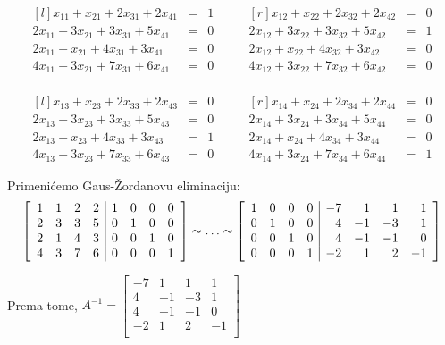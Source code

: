 \documentclass[10pt, a4paper]{article}
\begin{document}
\begin{equation*}
    \begin{aligned}[l]
        x_{11} + x_{21} + 2x_{31} + 2x_{41} &=& 1 \\
        2x_{11} + 3x_{21} + 3x_{31} + 5x_{41} &=& 0 \\
        2x_{11} + x_{21} + 4x_{31} + 3x_{41} &=& 0 \\
        4x_{11} + 3x_{21} + 7x_{31} + 6x_{41} &=& 0
    \end{aligned}
    \qquad
    \begin{aligned}[r]
        x_{12} + x_{22} + 2x_{32} + 2x_{42} &=& 0 \\
        2x_{12} + 3x_{22} + 3x_{32} + 5x_{42} &=& 1 \\
        2x_{12} + x_{22} + 4x_{32} + 3x_{42} &=& 0 \\
        4x_{12} + 3x_{22} + 7x_{32} + 6x_{42} &=& 0
    \end{aligned}
\end{equation*}
\\
\begin{equation*}
    \begin{aligned}[l]
        x_{13} + x_{23} + 2x_{33} + 2x_{43} &=& 0 \\
        2x_{13} + 3x_{23} + 3x_{33} + 5x_{43} &=& 0 \\
        2x_{13} + x_{23} + 4x_{33} + 3x_{43} &=& 1 \\
        4x_{13} + 3x_{23} + 7x_{33} + 6x_{43} &=& 0
    \end{aligned}
    \qquad
    \begin{aligned}[r]
        x_{14} + x_{24} + 2x_{34} + 2x_{44} &=& 0 \\
        2x_{14} + 3x_{24} + 3x_{34} + 5x_{44} &=& 0 \\
        2x_{14} + x_{24} + 4x_{34} + 3x_{44} &=& 0 \\
        4x_{14} + 3x_{24} + 7x_{34} + 6x_{44} &=& 1
    \end{aligned}
\end{equation*}

Primeni\'cemo Gaus-\v{Z}ordanovu eliminaciju:
\[
    \left[
        \begin{array}[]{cccc|cccc}
            1 & 1 & 2 & 2 & 1 & 0 & 0 & 0 \\
            2 & 3 & 3 & 5 & 0 & 1 & 0 & 0 \\
            2 & 1 & 4 & 3 & 0 & 0 & 1 & 0 \\
            4 & 3 & 7 & 6 & 0 & 0 & 0 & 1 \\
        \end{array}
    \right]
    \sim \ldots \sim
    \left[
        \begin{array}[]{cccc|rrrr}
            1 & 0 & 0 & 0 & -7 & 1 & 1 & 1 \\
            0 & 1 & 0 & 0 & 4 & -1 & -3 & 1\\
            0 & 0 & 1 & 0 & 4 & -1 & -1 & 0 \\
            0 & 0 & 0 & 1 & -2 & 1 & 2 & -1\\
        \end{array}
    \right]
\]

Prema tome, $A^{-1} = \left[ \begin{array}{rrrr}
    -7 & 1 & 1 & 1 \\
    4 & -1 & -3 & 1\\
    4 & -1 & -1 & 0 \\
    -2 & 1 & 2 & -1\\
 \end{array}\right]$
\end{document}
